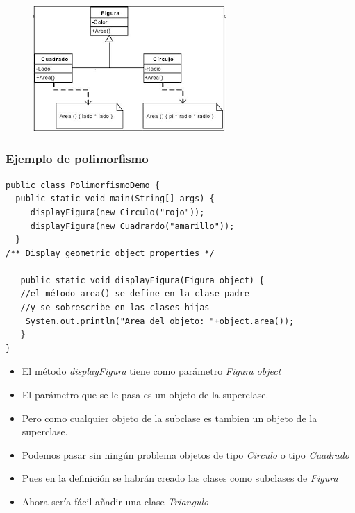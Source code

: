 \documentclass{beamer}
\begin{document}
\begin{frame}
\frametitle{}
\begin{figure}
\includegraphics[scale=0.8]{imagenes/figuras.png}
\end{figure}
\end{frame}


\begin{frame}[fragile]
\frametitle{Ejemplo de polimorfismo}
\begin{scriptsize}
\begin{verbatim}
public class PolimorfismoDemo {
  public static void main(String[] args) {
     displayFigura(new Circulo("rojo"));
     displayFigura(new Cuadrardo("amarillo"));
  }
/** Display geometric object properties */

   public static void displayFigura(Figura object) {
   //el método area() se define en la clase padre
   //y se sobrescribe en las clases hijas
    System.out.println("Area del objeto: "+object.area());
   }
}
\end{verbatim}
\pause
\begin{itemize}[<+->]
\item El método \emph{displayFigura} tiene como parámetro \emph{Figura object}
\item El parámetro que se le pasa es un objeto de la superclase.
\item Pero como cualquier objeto de la subclase es tambien un objeto de la superclase.
\item Podemos pasar sin ningún problema objetos de tipo \emph{Circulo} o tipo \emph{Cuadrado}
\item Pues en la definición se habrán creado las clases como subclases de \emph{Figura}
\item Ahora sería fácil añadir una clase \emph{Triangulo}
\end{itemize}
\end{scriptsize}
\end{frame}
\end{document}
